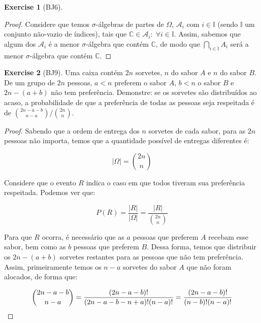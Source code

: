 \documentclass[
]{article}
\theoremstyle{definition}
\theoremstyle{definition}
\theoremstyle{definition}
\newtheorem{exercise}{Exercise}[section]
\theoremstyle{definition}
\theoremstyle{remark}
\begin{document}
\begin{exercise}[BJ6]
\begin{proof}
Considere que temos \(\sigma\)-álgebras de partes de \(\Omega\), \(\mathcal{A}_{i}\) com \(i \in \mathbb{I}\) (sendo \(\mathbb{I}\) um conjunto não-vazio de índices), tais que \(\mathbb{C} \in \mathcal{A}_{i}: \; \forall i \in \mathbb{I}\). Assim, sabemos que algum dos \(\mathcal{A}_{i}\) é a menor \(\sigma\)-álgebra que contém \(\mathbb{C}\), de modo que \(\bigcap_{i \in \mathbb{I}}A_{i}\) será a menor \(\sigma\)-álgebra que contém \(\mathbb{C}\).
\end{proof}

\end{exercise}

\begin{exercise}[BJ9]

Uma caixa contém \(2n\) sorvetes, \(n\) do sabor \(A\) e \(n\) do sabor \(B\). De um grupo de \(2n\) pessoas, \(a < n\) preferem o sabor \(A\), \(b < n\) o sabor \(B\) e \(2n-(a+b)\) não tem preferência. Demonstre: se os sorvetes são distribuídos ao acaso, a probabilidade de que a preferência de todas as pessoas seja respeitada é de \(\binom{2n-a-b}{n-a}/\binom{2n}{n}\).

\begin{proof}
Sabendo que a ordem de entrega dos \(n\) sorvetes de cada sabor, para as \(2n\) pessoas não importa, temos que a quantidade possível de entregas diferentes é:

\begin{equation*}
|\Omega| = \binom{2n}{n}
\end{equation*}

Considere que o evento \(R\) indica o caso em que todos tiveram sua preferência respeitada. Podemos ver que:

\begin{equation*}
P(R) = \frac{|R|}{|\Omega|} = \frac{|R|}{\binom{2n}{n}}
\end{equation*}

Para que \(R\) ocorra, é necessário que as \(a\) pessoas que preferem \(A\) recebam esse sabor, bem como as \(b\) pessoas que preferem \(B\). Dessa forma, temos que distribuir os \(2n-(a+b)\) sorvetes restantes para as pessoas que não tem preferência. Assim, primeiramente temos os \(n-a\) sorvetes do sabor \(A\) que não foram alocados, de forma que:

\begin{equation}
\binom{2n-a-b}{n-a} = \frac{(2n-a-b)!}{(2n-a-b-n+a)!(n-a)!} = \frac{(2n-a-b)!}{(n-b)!(n-a)!}\\
\label{eq:aloca}
\end{equation}


\end{proof}
\end{exercise}
\end{document}
